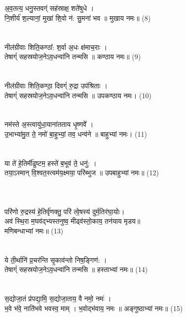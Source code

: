 {\small{}}\\
\\
अ॒व॒तत्य॒ धनु॒स्तवग्ं सह॑स्राक्ष॒ शते॑षुधे ।\\
नि॒शीर्य॑ श॒ल्यानां॒ मुखा॑ शि॒वो न॑: सु॒मना॑ भव ॥ मुखाय नमः॥ (8)\\
{\small{}}\\
\\
नील॑ग्रीवाः शिति॒कण्ठा᳚: श॒र्वा अ॒धः क्ष॑माच॒राः ।\\
तेषाग्ं॑ सहस्रयोज॒नेऽव॒धन्वा॑नि तन्मसि ॥ कण्ठाय नमः॥ (9)\\
{\small{}}\\
\\
नील॑ग्रीवाः शिति॒कण्ठा॒ दिवग्ं॑ रु॒द्रा उप॑श्रिताः ।\\
तेषाग्ं॑ सहस्रयोज॒नेऽव॒धन्वा॑नि तन्मसि ॥ उपकण्ठाय नमः। (10)\\
{\small{}}\\
\\
नम॑स्ते अ॒स्त्वायु॑धा॒याना॑तताय धृ॒ष्णवे᳚ ।\\
उ॒भाभ्या॑मु॒त ते॒ नमो॑ बा॒हुभ्यां॒ तव॒ धन्व॑ने ॥ बाहुभ्यां नमः। (11)\\
{\small{}}\\
\\
या ते॑ हे॒तिर्मी॑ढुष्टम॒ हस्ते॑ ब॒भूव॑ ते॒ धनु॑: ।\\
तया॒ऽस्मान् वि॒श्वत॒स्त्वम॑य॒क्ष्मया॒ परि॑ब्भुज ॥ उपबाहुभ्यां नमः॥ (12)\\
{\small{}}\\
\\
{\small{}}\\
परि॑णो रु॒द्रस्य॑ हे॒तिर्वृ॑णक्तु॒ परि॑ त्वे॒षस्य॑ दुर्म॒तिर॑घा॒योः।\\
अव॑ स्थि॒रा म॒घव॑द्भ्यस्तनुष्व॒ मीढ्व॑स्तो॒काय॒ तन॑याय मृडय॥\\
मणिबन्धाभ्यां नमः॥ (13)\\
{\small{}}\\
\\
ये ती॒र्थानि॑ प्र॒चर॑न्ति सृ॒काव॑न्तो निष॒ङ्गिण॑: ।\\
तेषाग्ं॑ सहस्रयोज॒नेऽव॒धन्वा॑नि तन्मसि ॥ हस्ताभ्यां नमः॥ (14)\\
{\small{}}\\
\\
स॒द्योजा॒तं प्र॑पद्या॒मि॒ स॒द्योजा॒ताय॒ वै नमो॒ नमः॑ ।\\
भ॒वे भ॑वे॒ नाति॑भवे भवस्व॒ माम् । भ॒वोद्भ॑वाय॒ नमः ॥ अङ्गुष्ठाभ्यां नमः॥ (15)\\
